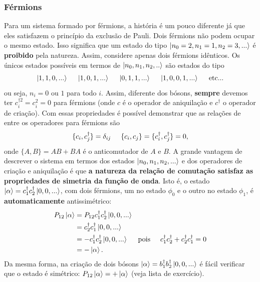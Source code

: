 \documentclass{article}
\begin{document}
\subsubsection{Férmions}

Para um sistema formado por férmions, a história é um pouco diferente já que eles satisfazem o princípio da exclusão de Pauli. Dois férmions não podem ocupar o mesmo estado. Isso significa que um estado do tipo $\ket{n_0 = 2, n_1 = 1,n_2 = 3,...}$ é \textbf{proibido} pela natureza. Assim, considere apenas dois férmions idênticos. Os únicos estados possíveis em termos de $\ket{n_0,n_1,n_2,..}$ são estados do tipo
\begin{equation}
    \ket{1,1,0,...} \hspace{0.5cm} \ket{1,0,1,...} \hspace{0.5cm} \ket{0,1,1,...} \hspace{0.5cm} \ket{1,0,0,1,...} \hspace{0.5cm} \text{etc...}
\end{equation}
ou seja, $n_i = 0$ ou $1$ para todo $i$. Assim, diferente dos bósons, \textbf{sempre} devemos ter $c^{\dagger 2}_i = c^{2}_i = 0$ para férmions (onde $c$ é o operador de aniquilação e $c^\dagger$ o operador de criação). Com essas propriedades é possível demonstrar que as relações de entre os operadores para férmions são
\begin{equation}
    \{c_i,c_j^\dagger \} = \delta_{ij} \hspace{0.5cm} \{c_i,c_j \} = \{c_i^\dagger,c_j^\dagger \} = 0,
\end{equation}
onde $\{ A,B \} = AB + BA$ é o anticomutador de $A$ e $B$. A grande vantagem de descrever o sistema em termos dos estados $\ket{n_0,n_1,n_2,...}$ e dos operadores de criação e aniquilação é que \textbf{a natureza da relação de comutação satisfaz as propriedades de simetria da função de onda}. Isto é, o estado $\ket{\alpha} = c_1^{\dagger} c_2^\dagger \ket{0,0,...}$, com dois férmions, um no estado $\phi_0$ e o outro no estado $\phi_1$, é \textbf{automaticamente} antissimétrico:
\begin{equation}
    \begin{split}
        P_{12}\ket{\alpha} &= P_{12}c_1^{\dagger} c_2^\dagger \ket{0,0,...} \\
                           &= c_2^{\dagger} c_1^\dagger \ket{0,0,...} \\
                           &= -c_1^{\dagger} c_2^\dagger \ket{0,0,...} \hspace{0.5cm} \text{pois} \hspace{0.5cm} c_1^\dagger c_2^\dagger + c_2^\dagger c_1^\dagger = 0 \\
                           & = -\ket{\alpha}.
    \end{split}
\end{equation}
Da mesma forma, na criação de dois bósons $\ket{\alpha} = b_1^{\dagger} b_2^\dagger \ket{0,0,...}$ é fácil verificar que o estado é simétrico: $P_{12}\ket{\alpha} = +\ket{\alpha}$ (veja lista de exercício).
\end{document}
